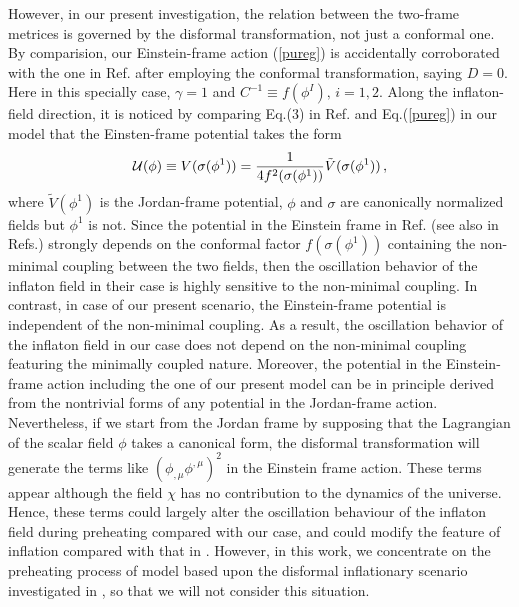 \documentclass[aps,prd,amsmath,amssymb,preprintnumbers,onecolumn,11pt,nofootinbib]{revtex4}
\begin{document}
However, in our present investigation, the relation between the two-frame metrices is governed by the disformal transformation, not just a conformal one. By comparision, our Einstein-frame action (\ref{pureg}) is accidentally corroborated with the one in Ref.\cite{DeCross:2015uza} after employing the conformal transformation, saying $D=0$. Here in this specially case, $\gamma=1$ and $C^{-1}\equiv f(\phi^{I}),\,i=1,2$. Along the inflaton-field direction, it is noticed by comparing Eq.(3) in Ref.\cite{DeCross:2015uza} and Eq.(\ref{pureg}) in our model that the Einsten-frame potential takes the form
\begin{eqnarray} 
{\cal U}(\phi) \equiv V(\sigma(\phi^{1})) = \frac{1}{4f^{2}(\sigma(\phi^{1}))}{\tilde V}(\sigma(\phi^{1}))\,,
\end{eqnarray}
where ${\tilde V}(\phi^{1})$ is the Jordan-frame potential, $\phi$ and $\sigma$ are canonically normalized fields but $\phi^{1}$ is not. Since the potential in the Einstein frame in Ref.\cite{DeCross:2015uza} (see also in Refs.\cite{DeCross:2016fdz,DeCross:2016cbs,Kaiser:2015usz}) strongly depends on the conformal factor $f(\sigma(\phi^{1}))$ containing the non-minimal coupling between the two fields, then the oscillation behavior of the inflaton field in their case is highly sensitive to the non-minimal coupling. In contrast, in case of our present scenario, the Einstein-frame potential is independent of the non-minimal coupling. As a result, the oscillation behavior of the inflaton field in our case does not depend on the non-minimal coupling featuring the minimally coupled nature. Moreover, the potential in the Einstein-frame action including the one of our present model can be in principle derived from the nontrivial forms of any potential in the Jordan-frame action.
Nevertheless, if we start from the Jordan frame by supposing that the Lagrangian of the scalar field $\phi$ takes a canonical form,
the disformal transformation will generate the terms like $(\phi_{,\mu}\phi^{,\mu})^2$ in the Einstein frame action.
These terms appear although the field $\chi$ has no contribution to the dynamics of the universe.
Hence, these terms could largely alter the oscillation behaviour of the inflaton field during preheating compared with our case,
and could modify the feature of inflation compared with that in  \cite{vandeBruck:2015tna}.
However, in this work, we  concentrate on the preheating process of model based upon the disformal inflationary scenario investigated in \cite{vandeBruck:2015tna},
so that we will not consider this situation.
\end{document}
